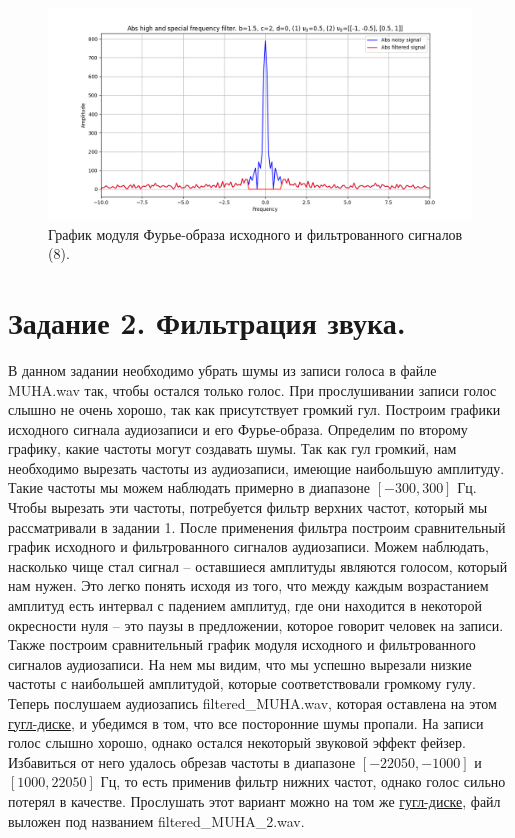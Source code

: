 \documentclass[a4paper, 12pt]{article}
\begin{document}
    \begin{figure}[H]
        \centering
        \includegraphics[scale=0.48]{8_4_abs_u_U_nospec.png}
        \captionsetup{skip=0pt}
        \caption{График модуля Фурье-образа исходного и фильтрованного сигналов (8).}
        \label{fig:skjfs}
    \end{figure}


    \section{Задание 2. Фильтрация звука.}
    В данном задании необходимо убрать шумы из записи голоса в файле MUHA.wav так, чтобы остался только голос. 
    При прослушивании записи голос слышно не очень хорошо, так как присутствует громкий гул. Построим графики
    исходного сигнала аудиозаписи и его Фурье-образа. Определим по второму графику, какие частоты могут создавать
    шумы. Так как гул громкий, нам необходимо вырезать частоты из аудиозаписи, имеющие наибольшую амплитуду. Такие частоты мы можем
    наблюдать примерно в диапазоне $[-300,300]$ Гц. Чтобы вырезать эти частоты, потребуется фильтр верхних частот, который
    мы рассматривали в задании 1. После применения фильтра построим сравнительный график исходного и фильтрованного
    сигналов аудиозаписи. Можем наблюдать, насколько чище стал сигнал -- оставшиеся амплитуды являются голосом, который 
    нам нужен. Это легко понять исходя из того, что между каждым возрастанием амплитуд есть интервал с падением амплитуд, 
    где они находится в некоторой окресности нуля -- это паузы в предложении, которое говорит человек на записи. Также построим
    сравнительный график модуля исходного и фильтрованного сигналов аудиозаписи. На нем мы видим, что мы успешно вырезали
    низкие частоты с наибольшей амплитудой, которые соответствовали громкому гулу. Теперь послушаем аудиозапись filtered\_{MUHA}.wav, которая 
    оставлена на этом \href{https://drive.google.com/drive/folders/1AuXIiKRWvXFOtJqV3uqPzC494zZ7vCrd?usp=sharing}{гугл-диске}, 
    и убедимся в том, что все посторонние шумы пропали. На записи голос слышно хорошо, однако остался некоторый звуковой эффект 
    фейзер. Избавиться от него удалось обрезав частоты в диапазоне $[-22050, -1000]$ и $[1000, 22050]$ Гц, то есть применив фильтр нижних частот,
    однако голос сильно потерял в качестве. Прослушать этот вариант можно на том же
    \href{https://drive.google.com/drive/folders/1AuXIiKRWvXFOtJqV3uqPzC494zZ7vCrd?usp=sharing}{гугл-диске},
    файл выложен под названием filtered\_{MUHA}\_{2}.wav.
\end{document}
